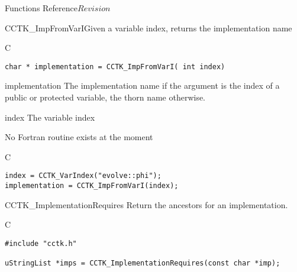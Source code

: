 \begin{cactuspart}{ Functions Reference}{}{$Revision$}



\begin{FunctionDescription}{CCTK\_ImpFromVarI}{Given a variable index, returns the implementation name}
\label{CCTK-ImpFromVarI}
\begin{SynopsisSection}
\begin{Synopsis}{C}
\begin{verbatim}char * implementation = CCTK_ImpFromVarI( int index)\end{verbatim}
\end{Synopsis}
\end{SynopsisSection}
\begin{ParameterSection}
\begin{Parameter}{implementation}
The implementation name if the argument is the index of a public
or protected variable, the thorn name otherwise.
\end{Parameter}
\begin{Parameter}{index}
The variable index
\end{Parameter}
\end{ParameterSection}
\begin{Discussion}
No Fortran routine exists at the moment
\end{Discussion}
\begin{ExampleSection}
\begin{Example}{C}
\begin{verbatim}
index = CCTK_VarIndex("evolve::phi");
implementation = CCTK_ImpFromVarI(index);
\end{verbatim}
\end{Example}
\end{ExampleSection}
\end{FunctionDescription}



\begin{FunctionDescription}{CCTK\_ImplementationRequires}
\label{CCTK-ImplementationRequires}
Return the ancestors for an implementation.

\begin{SynopsisSection}
\begin{Synopsis}{C}
\begin{verbatim}
#include "cctk.h"

uStringList *imps = CCTK_ImplementationRequires(const char *imp);
\end{verbatim}
\end{Synopsis}
\end{SynopsisSection}


\end{FunctionDescription}
\end{cactuspart}
